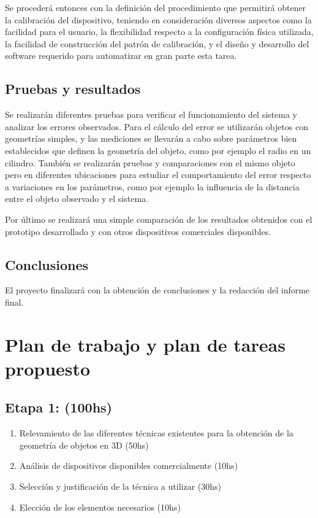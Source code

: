 Se procederá entonces con la definición del procedimiento que permitirá obtener la calibración del dispositivo, teniendo en consideración diversos aspectos como la facilidad para el usuario, la flexibilidad respecto a la configuración física utilizada, la facilidad de construcción del patrón de calibración, y el diseño y desarrollo del software requerido para automatizar en gran parte esta tarea.

\subsection{Pruebas y resultados}
Se realizarán diferentes pruebas para verificar el funcionamiento del sistema y analizar los errores observados. Para el cálculo del error se utilizarán objetos con geometrías simples, y las mediciones se llevarán a cabo sobre parámetros bien establecidos que definen la geometría del objeto, como por ejemplo el radio en un cilindro. También se realizarán pruebas y comparaciones con el mismo objeto pero en diferentes ubicaciones para estudiar el comportamiento del error respecto a variaciones en los parámetros, como por ejemplo la influencia de la distancia entre el objeto observado y el sistema.

Por último se realizará una simple comparación de los resultados obtenidos con el prototipo desarrollado y con otros dispositivos comerciales disponibles.

\subsection{Conclusiones}
El proyecto finalizará con la obtención de conclusiones y la redacción del informe final.

\section{Plan de trabajo y plan de tareas propuesto}
\subsection{Etapa 1: (100hs)}
\begin{enumerate}
\item Relevamiento de las diferentes técnicas existentes para la obtención de la geometría de objetos en 3D (50hs)
\item Análisis de dispositivos disponibles comercialmente (10hs)
\item Selección y justificación de la técnica a utilizar (30hs)
\item Elección de los elementos necesarios (10hs)
\end{enumerate}


